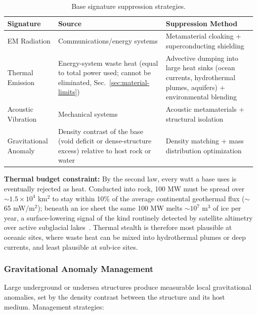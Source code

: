 \documentclass[aps,prd,twocolumn,superscriptaddress,nofootinbib]{revtex4-2}
\begin{document}
\begin{table}[htbp]
\caption{Base signature suppression strategies.}
\label{tab:signature-suppression}
\footnotesize
\begin{tabular}{P{0.190\textwidth}P{0.347\textwidth}P{0.360\textwidth}}
\toprule
Signature & Source & Suppression Method \\
\midrule
EM Radiation & Communications/energy systems & Metamaterial cloaking + superconducting shielding \\
Thermal Emission & Energy-system waste heat (equal to total power used; cannot be eliminated, Sec.~\ref{sec:material-limits}) & Advective dumping into large heat sinks (ocean currents, hydrothermal plumes, aquifers) + environmental blending \\
Acoustic Vibration & Mechanical systems & Acoustic metamaterials + structural isolation \\
Gravitational Anomaly & Density contrast of the base (void deficit or dense-structure excess) relative to host rock or water & Density matching + mass distribution optimization \\
\bottomrule
\end{tabular}
\end{table}

\textbf{Thermal budget constraint:} By the second law, every watt a base uses is eventually rejected as heat. Conducted into rock, 100 MW must be spread over ${\sim}1.5\times10^{4}$ km$^{2}$ to stay within 10\% of the average continental geothermal flux (${\sim}$65 mW/m$^{2}$); beneath an ice sheet the same 100 MW melts ${\sim}10^{7}$ m$^{3}$ of ice per year, a surface-lowering signal of the kind routinely detected by satellite altimetry over active subglacial lakes~\cite{Smith2009}. Thermal stealth is therefore most plausible at oceanic sites, where waste heat can be mixed into hydrothermal plumes or deep currents, and least plausible at sub-ice sites.

\subsubsection{Gravitational Anomaly Management}\label{sec:grav-anomaly}

Large underground or undersea structures produce measurable local gravitational anomalies, set by the density contrast between the structure and its host medium. Management strategies:
\end{document}
